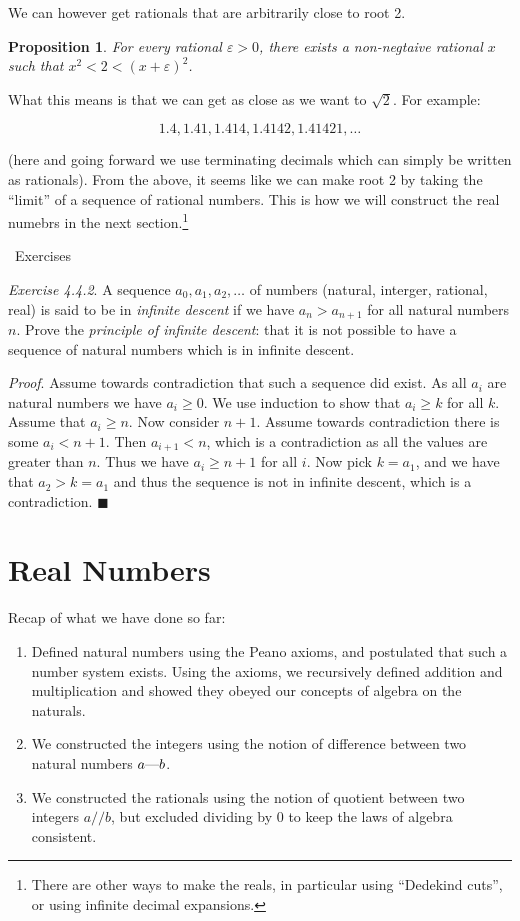 \documentclass{article}
\newtheorem{proposition}{Proposition}[subsection]
\newcommand{\exercisesline}{	%
    \begin{center}
    \textemdash\ Exercises\ \textemdash
    \end{center}
}
\newcommand{\mem}{\text{\textemdash}} %
\newcommand{\vep}{\varepsilon} %
\let\it\textit
\begin{document}
We can however get rationals that are arbitrarily close to root 2.

\begin{proposition}
	For every rational $\vep >0$, there exists 
	a non-negtaive rational $x$ such that $x^2 < 2 < (x + \vep)^2$. 
\end{proposition}

What this means is that we can get as close as we want to $\sqrt{2}$.
For example:

$$
1.4, 1.41, 1.414, 1.4142, 1.41421, \ldots
$$

(here and going forward we use terminating decimals which can 
simply be written as rationals). From the above, it seems 
like we can make root 2 by taking the ``limit'' of 
a sequence of rational numbers. This is how we will 
construct the real numebrs in the next section.\footnote{There
are other ways to make the reals, in particular using 
``Dedekind cuts'', or using infinite decimal expansions.} 

\exercisesline

\it{Exercise 4.4.2}. A sequence $a_0, a_1, a_2, \dots$ of numbers 
(natural, interger, rational, real) is said to be in \it{infinite descent}
if we have $a_n > a_{n+1}$ for all natural numbers $n$. Prove 
the \it{principle of infinite descent}: that it is not possible 
to have a sequence of natural numbers which is in infinite descent.

\it{Proof}. Assume towards contradiction that such a sequence 
did exist. As all $a_i$ are natural numbers we have $a_i \geq 0$. 
We use induction to show that $a_i \geq k$ for all $k$. Assume 
that $a_i \geq n$. Now consider $n+1$. Assume towards contradiction 
there is some $a_i < n+1$. Then $a_{i+1} < n$, which is a contradiction 
as all the values are greater than $n$. Thus we have $a_i \geq n+1$
for all $i$. Now pick $k = a_1$, and we have that $a_2 > k = a_1$ and
thus the sequence is not in infinite descent, which is
a contradiction. \hfill $\blacksquare$





\section{Real Numbers}


Recap of what we have done so far:
\begin{enumerate}
	\item Defined natural numbers using the Peano axioms, and 
		postulated that such a number system exists. Using 
		the axioms, we recursively defined addition 
		and multiplication and showed they obeyed our 
		concepts of algebra on the naturals.
	\item We constructed the integers using the notion 
		of difference between two natural numbers $a\mem b$. 
	\item We constructed the rationals using the notion of 
		quotient between two integers $a//b$, but excluded
		dividing by $0$ to keep the laws of algebra consistent.
\end{enumerate}
\end{document}
